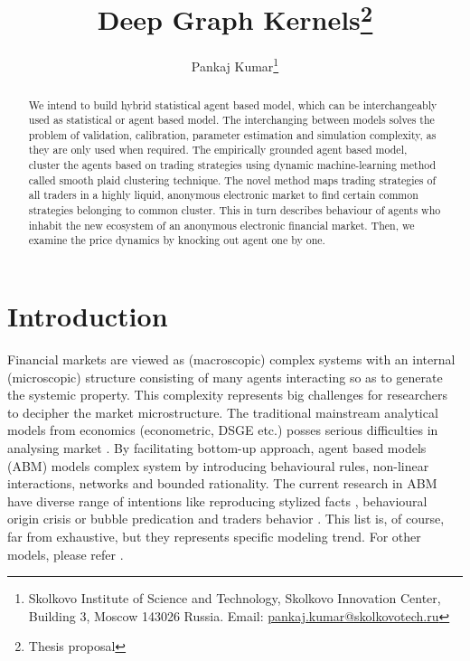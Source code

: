 \documentclass[12pt,a4paper]{article}
\title{Deep Graph Kernels\thanks{Thesis proposal} }
\author{Pankaj Kumar\thanks{Skolkovo Institute of Science and Technology, Skolkovo Innovation Center, Building 3, Moscow  143026 Russia. Email: \url{pankaj.kumar@skolkovotech.ru}}}
\date{}
\numberwithin{equation}{section}
\numberwithin{figure}{section}
\numberwithin{table}{section}
\begin{document}
\maketitle
\begin{abstract}
We intend to build hybrid statistical agent based model, which can be interchangeably used as statistical or agent based model. The interchanging between models solves the problem of validation, calibration, parameter estimation and simulation complexity, as they are only used when required. The empirically grounded agent based model, cluster the agents based on trading strategies using dynamic machine-learning method called smooth plaid clustering technique. The novel method maps trading strategies of all traders in a highly liquid, anonymous electronic market to find certain common strategies belonging to common cluster. This in turn describes behaviour of agents who inhabit the new ecosystem of an anonymous electronic financial market. Then, we examine the price dynamics by knocking out agent one by one.
\end{abstract}
\section{Introduction}
Financial markets are viewed as (macroscopic) complex systems with an internal (microscopic) structure consisting of many agents interacting so as to generate the systemic property. This complexity represents big challenges for researchers to decipher the market microstructure. The traditional mainstream analytical models from economics (econometric, DSGE etc.) posses serious difficulties in analysing market \citep{farmer2009}. By facilitating bottom-up approach, agent based models (ABM) models complex system by introducing behavioural rules, non-linear interactions, networks and bounded rationality. The current research in ABM have diverse range of intentions like reproducing stylized facts \citep{Stanley1999, BouchaudPotters2004}, behavioural origin \citep{AlfiPietroneroZaccaria2009I, AlfiPietroneroZaccaria2009II, CristelliPietroneroZaccaria2009, FengLiPodobnikPreisStanley2012} crisis or bubble predication \citep{bonnet2005, KirilenkoKyleSamadiTuzun2010, harras2011,farmer2011} and traders behavior \citep{LuxMarchesi1999, ContBouchaud2000, chiarella2002}. This list is, of course, far from exhaustive, but they represents specific modeling trend. For other models, please refer \citet{CristelliPietroneroZaccaria2011, chak2011, samanidou2007, lebaron2006}. 
 
\end{document}
